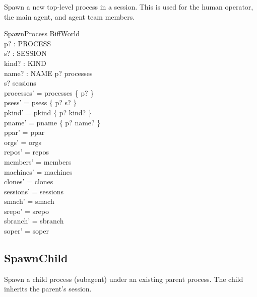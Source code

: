 \documentclass[a4paper,10pt,fleqn]{article}
\begin{document}
Spawn a new top-level process in a session.  This is used for the human
operator, the main agent, and agent team members.

\begin{schema}{SpawnProcess}
  \Delta BiffWorld \\
  p? : PROCESS \\
  s? : SESSION \\
  kind? : KIND \\
  name? : NAME
  \where
  p? \notin processes \\
  s? \in sessions \\
  processes' = processes \cup \{ p? \} \\
  psess' = psess \cup \{ p? \mapsto s? \} \\
  pkind' = pkind \cup \{ p? \mapsto kind? \} \\
  pname' = pname \cup \{ p? \mapsto name? \} \\
  ppar' = ppar \\
  orgs' = orgs \\
  repos' = repos \\
  members' = members \\
  machines' = machines \\
  clones' = clones \\
  sessions' = sessions \\
  smach' = smach \\
  srepo' = srepo \\
  sbranch' = sbranch \\
  soper' = soper
\end{schema}

\subsection{SpawnChild}

Spawn a child process (subagent) under an existing parent process.  The
child inherits the parent's session.
\end{document}
